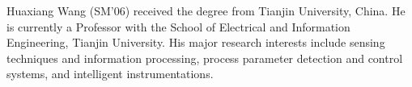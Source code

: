 %
%



\begin{IEEEbiography}{Huaxiang Wang}
(SM'06) received the degree from Tianjin University, China. He is currently a Professor with the School of Electrical and Information Engineering, Tianjin University.  His major research interests include sensing techniques and information processing, process parameter detection and control systems, and intelligent instrumentations.
\end{IEEEbiography}


\vfill




